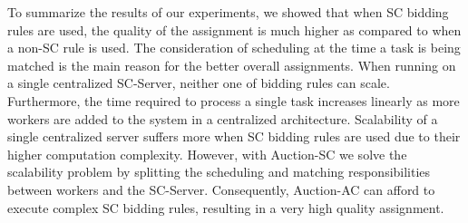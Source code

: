 To summarize the results of our experiments, we showed that when SC bidding rules are used, the quality of the assignment is much higher as compared to when a non-SC rule is used. The consideration of scheduling at the time a task is being matched is the main reason for the better overall assignments. When running on a single centralized SC-Server, neither one of bidding rules can scale. Furthermore, the time required to process a single task increases linearly as more workers are added to the system in a centralized architecture. Scalability of a single centralized server suffers more when SC bidding rules are used due to their higher computation complexity. However, with Auction-SC we solve the scalability problem by splitting the scheduling and matching responsibilities between workers and the SC-Server. Consequently, Auction-AC can afford to execute complex SC bidding rules, resulting in a very high quality assignment. %

